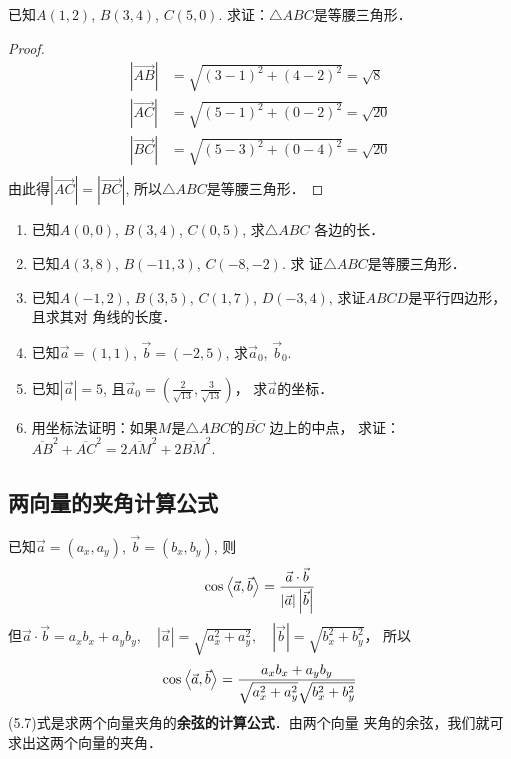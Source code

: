 \begin{example}
    已知$A(1,2)$, $B(3,4)$, $C(5,0)$. 求证：$\triangle ABC$是等腰三角形．
\end{example}

\begin{proof}
\[\begin{split}
|\Vec{AB}|&=\sqrt{(3-1)^2+(4-2)^2}=\sqrt{8}\\
|\Vec{AC}|&=\sqrt{(5-1)^2+(0-2)^2}=\sqrt{20}\\
|\Vec{BC}|&=\sqrt{(5-3)^2+(0-4)^2}=\sqrt{20}\\
\end{split}\]
由此得$|\Vec{AC}|=|\Vec{BC}|$, 所以$\triangle ABC$是等腰三角形．
\end{proof}

\begin{ex}
\begin{enumerate}
    \item 已知$A(0,0)$, $B(3,4)$, $C(0,5)$, 求$\triangle ABC$
    各边的长．
    \item 已知$A(3,8)$, $B(-11,3)$, $C(-8,-2)$. 求
    证$\triangle ABC$是等腰三角形．
    \item 已知$A(-1,2)$, $B(3,5)$, $C(1,7)$, 
    $D(-3,4)$, 求证$ABCD$是平行四边形，且求其对
    角线的长度．
    \item 已知$\vec{a}=(1,1)$, $\vec{b}=(-2,5)$, 求$\vec{a}_0$, $\vec{b}_0$.
    \item 已知$|\vec{a}|=5$, 且$\vec{a}_0=\left(\frac{2}{\sqrt{13}},\frac{3}{\sqrt{13}}\right)$，
    求$\vec{a}$的坐标．
    \item 用坐标法证明：如果$M$是$\triangle ABC$的$\overline{BC}$
    边上的中点，
    求证：$\overline{AB}^2+\overline{AC}^2=2\overline{AM}^2+2\overline{BM}^2$.
\end{enumerate}
\end{ex}

\subsection{两向量的夹角计算公式}

已知$\vec{a}=(a_x,a_y)$, $\vec{b}=(b_x,b_y)$, 则
\[\cos\left\langle \vec{a},\vec{b} \right\rangle=\dfrac{\vec{a}\cdot \vec{b}}{|\vec{a}|\left|\vec{b}\right|}\]
但$\vec{a}\cdot \vec{b}=a_xb_x+a_yb_y,\quad |\vec{a}|=\sqrt{a_x^2+a_y^2},\quad \left|\vec{b}\right|=\sqrt{b_x^2+b_y^2}$，
所以
\begin{equation}
    \cos\left\langle \vec{a},\vec{b} \right\rangle=\dfrac{a_xb_x+a_yb_y}{\sqrt{a_x^2+a_y^2}\sqrt{b_x^2+b_y^2}}
\end{equation}
(5.7)式是求两个向量夹角的\textbf{余弦的计算公式}．由两个向量
夹角的余弦，我们就可求出这两个向量的夹角．

